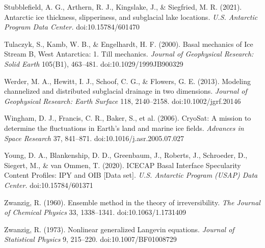 \documentclass[11pt]{article}
\begin{document}
Stubblefield, A. G., Arthern, R. J., Kingslake, J., \& Siegfried, M. R. (2021). Antarctic ice thickness, slipperiness, and subglacial lake locations. \emph{U.S. Antarctic Program Data Center.} doi:10.15784/601470


Tulaczyk, S., Kamb, W. B., \& Engelhardt, H. F. (2000). Basal mechanics of Ice Stream B, West Antarctica: 1. Till mechanics. \emph{Journal of Geophysical Research: Solid Earth} 105(B1), 463–481. doi:10.1029/1999JB900329


Werder, M. A., Hewitt, I. J., Schoof, C. G., \& Flowers, G. E. (2013). Modeling channelized and distributed subglacial drainage in two dimensions. \emph{Journal of Geophysical Research: Earth Surface} 118, 2140–2158. doi:10.1002/jgrf.20146


Wingham, D. J., Francis, C. R., Baker, S., et al. (2006). CryoSat: A mission to determine the fluctuations in Earth's land and marine ice fields. \emph{Advances in Space Research} 37, 841–871. doi:10.1016/j.asr.2005.07.027


Young, D. A., Blankenship, D. D., Greenbaum, J., Roberts, J., Schroeder, D., Siegert, M., \& van Ommen, T. (2020). ICECAP Basal Interface Specularity Content Profiles: IPY and OIB [Data set]. \emph{U.S. Antarctic Program (USAP) Data Center.} doi:10.15784/601371


Zwanzig, R. (1960). Ensemble method in the theory of irreversibility. \emph{The Journal of Chemical Physics} 33, 1338–1341. doi:10.1063/1.1731409


Zwanzig, R. (1973). Nonlinear generalized Langevin equations. \emph{Journal of Statistical Physics} 9, 215–220. doi:10.1007/BF01008729
\end{document}
